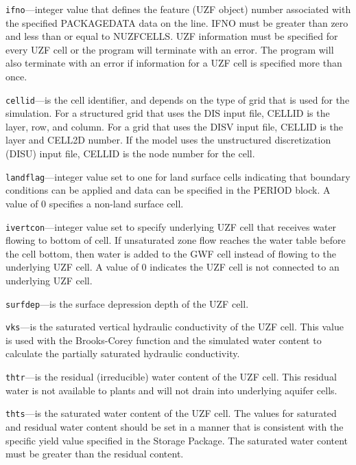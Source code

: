 \begin{description}
\item \texttt{ifno}---integer value that defines the feature (UZF object) number associated with the specified PACKAGEDATA data on the line. IFNO must be greater than zero and less than or equal to NUZFCELLS.  UZF information must be specified for every UZF cell or the program will terminate with an error.  The program will also terminate with an error if information for a UZF cell is specified more than once.

\item \texttt{cellid}---is the cell identifier, and depends on the type of grid that is used for the simulation.  For a structured grid that uses the DIS input file, CELLID is the layer, row, and column.   For a grid that uses the DISV input file, CELLID is the layer and CELL2D number.  If the model uses the unstructured discretization (DISU) input file, CELLID is the node number for the cell.

\item \texttt{landflag}---integer value set to one for land surface cells indicating that boundary conditions can be applied and data can be specified in the PERIOD block. A value of 0 specifies a non-land surface cell.

\item \texttt{ivertcon}---integer value set to specify underlying UZF cell that receives water flowing to bottom of cell. If unsaturated zone flow reaches the water table before the cell bottom, then water is added to the GWF cell instead of flowing to the underlying UZF cell. A value of 0 indicates the UZF cell is not connected to an underlying UZF cell.

\item \texttt{surfdep}---is the surface depression depth of the UZF cell.

\item \texttt{vks}---is the saturated vertical hydraulic conductivity of the UZF cell.  This value is used with the Brooks-Corey function and the simulated water content to calculate the partially saturated hydraulic conductivity.

\item \texttt{thtr}---is the residual (irreducible) water content of the UZF cell.  This residual water is not available to plants and will not drain into underlying aquifer cells.

\item \texttt{thts}---is the saturated water content of the UZF cell.  The values for saturated and residual water content should be set in a manner that is consistent with the specific yield value specified in the Storage Package.  The saturated water content must be greater than the residual content.


\end{description}
